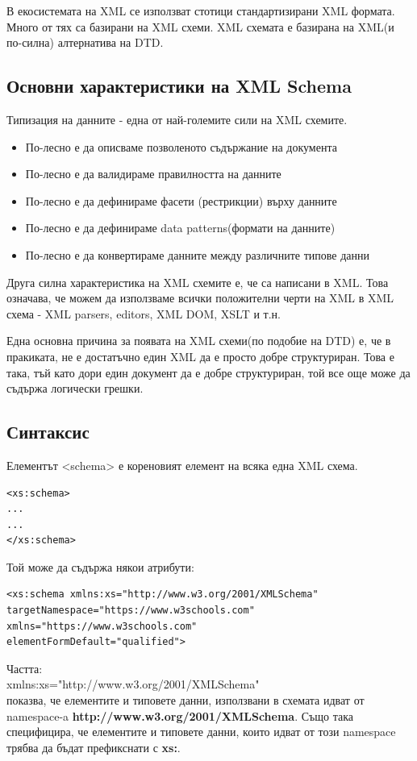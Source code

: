 \documentclass[11pt]{article} %
\begin{document}
В екосистемата на XML се използват стотици стандартизирани XML формата. Много от тях са базирани на XML схеми. XML схемата е базирана на XML(и по-силна) алтернатива на DTD.  

\subsection{Основни характеристики на XML Schema}
Типизация на данните - една от най-големите сили на XML схемите.
\begin{itemize}
	\item По-лесно е да описваме позволеното съдържание на документа
	\item По-лесно е да валидираме правилността на данните
	\item По-лесно е да дефинираме фасети (рестрикции) върху данните
	\item По-лесно е да дефинираме data patterns(формати на данните)
	\item По-лесно е да конвертираме данните между различните типове данни 
\end{itemize}

Друга силна характеристика на XML схемите е, че са написани в XML. Това означава, че можем да използваме всички положителни черти на XML в XML схема - XML parsers, editors, XML DOM, XSLT и т.н.

Една основна причина за появата на XML схеми(по подобие на DTD) е, че в пракиката, не е достатъчно един XML да е просто добре структуриран. Това е така, тъй като дори един документ да е добре структуриран, той все още може да съдържа логически грешки.

\subsection{Синтаксис}
Елементът <schema> е кореновият елемент на всяка една XML схема.
\begin{verbatim}
<xs:schema>
...
...
</xs:schema>
\end{verbatim}

Той може да съдържа някои атрибути:
\begin{verbatim}
<xs:schema xmlns:xs="http://www.w3.org/2001/XMLSchema"
targetNamespace="https://www.w3schools.com"
xmlns="https://www.w3schools.com"
elementFormDefault="qualified">
\end{verbatim}

Частта:\\
xmlns:xs="http://www.w3.org/2001/XMLSchema"\\
показва, че елементите и типовете данни, използвани в схемата идват от namespace-a \textbf{http://www.w3.org/2001/XMLSchema}. Също така специфицира, че елементите и типовете данни, които идват от този namespace трябва да бъдат префикснати с \textbf{xs:}.\\\par
\end{document}
